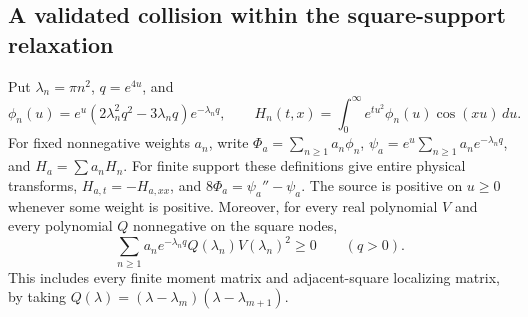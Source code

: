 \documentclass[11pt]{article}
\numberwithin{equation}{section}
\theoremstyle{definition}
\theoremstyle{remark}
\begin{document}
\subsection{A validated collision within the square-support relaxation}

Put $\lambda_n=\pi n^2$, $q=e^{4u}$, and
\[
 \phi_n(u)=e^u(2\lambda_n^2q^2-3\lambda_nq)e^{-\lambda_nq},
 \qquad H_n(t,x)=\int_0^\infty e^{tu^2}\phi_n(u)\cos(xu)\,du.
\]
For fixed nonnegative weights $a_n$, write
$\Phi_a=\sum_{n\ge1}a_n\phi_n$,
$\psi_a=e^u\sum_{n\ge1}a_ne^{-\lambda_nq}$, and $H_a=\sum a_nH_n$.
For finite support these definitions give entire physical transforms,
$H_{a,t}=-H_{a,xx}$, and $8\Phi_a=\psi_a''-\psi_a$.
The source is positive on $u\ge0$ whenever some weight is positive.
Moreover, for every real polynomial $V$ and every polynomial $Q$ nonnegative
on the square nodes,
\begin{equation}
 \sum_{n\ge1}a_ne^{-\lambda_nq}Q(\lambda_n)V(\lambda_n)^2\ge0
 \qquad(q>0).
 \label{arith:localizers}
\end{equation}
This includes every finite moment matrix and adjacent-square localizing
matrix, by taking $Q(\lambda)=(\lambda-\lambda_m)(\lambda-\lambda_{m+1})$.
\end{document}
